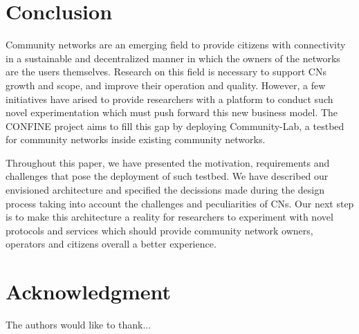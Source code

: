 \documentclass[conference]{IEEEtran}
\begin{document}
\section{Conclusion}

Community networks are an emerging field to provide citizens with connectivity in a sustainable and
decentralized manner in which the owners of the networks are the users themselves. Research on this field
is necessary to support CNs growth and scope, and improve their operation and quality. However, a few initiatives
have arised to provide researchers with a platform to conduct such novel experimentation which must
push forward this new business model. The CONFINE project aims to fill this gap by deploying Community-Lab,
a testbed for community networks inside existing community networks. 

Throughout this paper, we have presented the motivation, requirements and challenges that pose the deployment
of such testbed. We have described our envisioned architecture and specified the decissions made during
the design process taking into account the challenges and peculiarities of CNs. Our next step is to make this
architecture a reality for researchers to experiment with novel protocols and services which should
provide community network owners, operators and citizens overall a better experience.

\section*{Acknowledgment}

The authors would like to thank...








\end{document}
